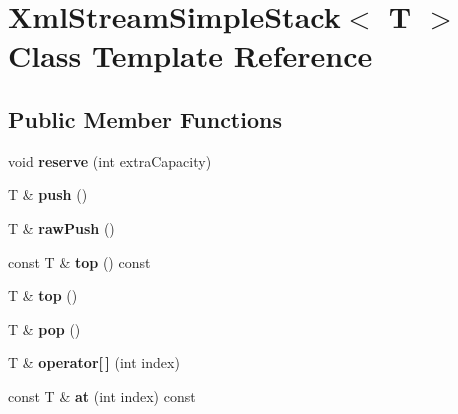\hypertarget{class_xml_stream_simple_stack}{}\section{Xml\+Stream\+Simple\+Stack$<$ T $>$ Class Template Reference}
\label{class_xml_stream_simple_stack}
\subsection*{Public Member Functions}
\begin{DoxyCompactItemize}
\item 
\mbox{\label{class_xml_stream_simple_stack_a46c98b186667140fd97fc34384452518}} 
void {\bfseries reserve} (int extra\+Capacity)
\item 
\mbox{\label{class_xml_stream_simple_stack_a0bf3045ecf25881707aa46fc70613383}} 
T \& {\bfseries push} ()
\item 
\mbox{\label{class_xml_stream_simple_stack_a6c9b749c2c59391443ec4fc390b1677f}} 
T \& {\bfseries raw\+Push} ()
\item 
\mbox{\label{class_xml_stream_simple_stack_a1fed2d9b0a75ef39a042bd9b83008794}} 
const T \& {\bfseries top} () const
\item 
\mbox{\label{class_xml_stream_simple_stack_a5e0af4652643fd77de25c6f9d7988c2e}} 
T \& {\bfseries top} ()
\item 
\mbox{\label{class_xml_stream_simple_stack_ab4d012f2f05edf7af31c0016b314cb71}} 
T \& {\bfseries pop} ()
\item 
\mbox{\label{class_xml_stream_simple_stack_a46a08e0070e5e1a7d6511fc211600c3e}} 
T \& {\bfseries operator\mbox{[}$\,$\mbox{]}} (int index)
\item 
\mbox{\label{class_xml_stream_simple_stack_ae324f47f8eae637ddcb2d6056e2c2d7b}} 
const T \& {\bfseries at} (int index) const
\item 

\end{DoxyCompactItemize}
